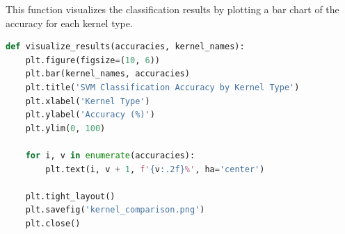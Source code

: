 \documentclass{homework}
\begin{document}





This function visualizes the classification results by plotting a bar chart of the accuracy for each kernel type.





\begin{lstlisting}[language=Python]
def visualize_results(accuracies, kernel_names):
    plt.figure(figsize=(10, 6))
    plt.bar(kernel_names, accuracies)
    plt.title('SVM Classification Accuracy by Kernel Type')
    plt.xlabel('Kernel Type')
    plt.ylabel('Accuracy (%)')
    plt.ylim(0, 100)
    
    for i, v in enumerate(accuracies):
        plt.text(i, v + 1, f'{v:.2f}%', ha='center')
    
    plt.tight_layout()
    plt.savefig('kernel_comparison.png')
    plt.close()
\end{lstlisting}
\end{document}
